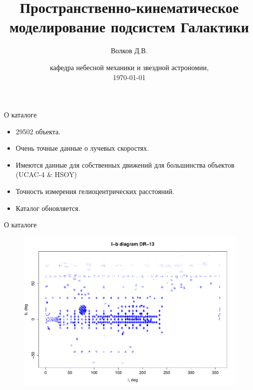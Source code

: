 \documentclass{beamer}
\begin{document}
\title{Пространственно-кинематическое моделирование подсистем Галактики}  
\author{Волков Д.В.}
\date{кафедра небесной механики и звездной астрономии, \\ \today} 
\frame{\titlepage} 

\begin{frame}{О каталоге}
	\begin{itemize}
		\item 29502 объекта.
		\item Очень точные данные о лучевых скоростях.	
                \item Имеются данные для собственных движений для большинства объектов (UCAC-4 & HSOY)
		\item Точность измерения гелиоцентрических расстояний.
		\item Каталог обновляется.
	\end{itemize}
\end{frame}

\begin{frame}{О каталоге}
	\begin{center}
	\begin{figure}[h]
\begin{minipage}[h]{0.8\linewidth}
\includegraphics[width=1\linewidth]{pdf/lb_dr13.pdf}
\end{minipage}
\end{figure}
	\end{center}
\end{frame}
\end{document}
